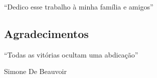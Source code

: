 \documentclass{ufpatcc}
\begin{document}
\ufpaPaginaDeRosto


\ufpaPagRostodo 

\ufpaPaginaDeAprovacao


\begin{ufpaOferecimento}
    “Dedico esse trabalho à minha família e amigos”

\end{ufpaOferecimento}


\begin{ufpaAgradecimentos}
	\chapter*{Agradecimentos}
	
	
	
\end{ufpaAgradecimentos}


\begin{ufpaEpigrafe}
    ``Todas as vitórias ocultam uma abdicação''
    \begin{flushright}Simone De Beauvoir\end{flushright}
\end{ufpaEpigrafe}



\tableofcontents
\clearpage

%
%
%
%
%


\end{document}
